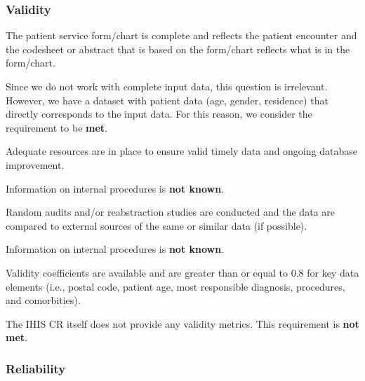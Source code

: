 \subsubsection{Validity}

\begin{QandA}
    \item The patient service form/chart is complete and reflects the patient encounter and the codesheet or abstract that is based on the form/chart reflects what is in the form/chart.
    \begin{answered}
        Since we do not work with complete input data, this question is irrelevant.
        However, we have a dataset with patient data (age, gender, residence) that directly corresponds to the input data.
        For this reason, we consider the requirement to be \textbf{met}.
    \end{answered}

    \item Adequate resources are in place to ensure valid timely data and ongoing database improvement.
    \begin{answered}
        Information on internal procedures is \textbf{not known}.
    \end{answered}

    \item Random audits and/or reabstraction studies are conducted and the data are compared to external sources of the same or similar data (if possible).
    \begin{answered}
        Information on internal procedures is \textbf{not known}.
    \end{answered}

    \item Validity coefficients are available and are greater than or equal to 0.8 for key data elements (i.e., postal code, patient age, most responsible diagnosis, procedures, and comorbities).
    \begin{answered}
        The IHIS CR itself does not provide any validity metrics.
        This requirement is \textbf{not met}.
    \end{answered}

\end{QandA}

\subsubsection{Reliability}

